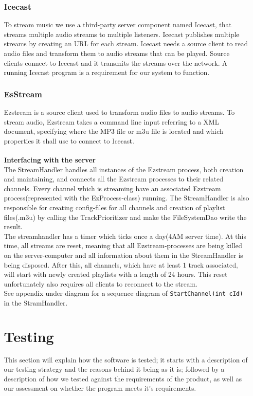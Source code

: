\documentclass[a4paper,11pt,report]{article}
\begin{document}
\subsubsection{Icecast}
To stream music we use a third-party server component named Icecast\cite{IceCast}, that streams multiple audio streams to multiple listeners. Icecast publishes multiple streams by creating an URL for each stream. Icecast needs a source client to read audio files and transform them to audio streams that can be played. Source clients connect to Icecast and it transmits the streams over the network. A running Icecast program is a requirement for our system to function.
\subsubsection{EsStream}
Ezstream\cite{EzStream} is a source client used to transform audio files to audio streams. To stream audio, Ezstream takes a command line input referring to a XML document, specifying where the MP3 file or m3u file is located and which properties it shall use to connect to Icecast. \\ \\
\textbf{Interfacing with the server} \\
The StreamHandler handles all instances of the Ezstream process, both creation and maintaining, and connects all the Ezstream processes to their related channels. Every channel which is streaming have an associated Ezstream process(represented with the EzProcess-class) running. The StreamHandler is also responsible for creating config-files for all channels and creation of playlist files(.m3u) by calling the TrackPrioritizer and make the FileSystemDao write the result. \\

The streamhandler has a timer which ticks once a day(4AM server time). At this time, all streams are reset, meaning that all Ezstream-processes are being killed on the server-computer and all information about them in the StreamHandler is being disposed. After this, all channels, which have at least 1 track associated, will start with newly created playlists with a length of 24 hours. This reset unfortunately also requires all clients to reconnect to the stream. \\

See appendix under diagram for a sequence diagram of \texttt{StartChannel(int cId)} in the StramHandler.


\section{Testing}
This section will explain how the software is tested; it starts with a description of our testing strategy and the reasons behind it being
as it is; followed by a description of how we tested against the requirements of the product, as well as our assessment on whether the program meets it's requirements.
\end{document}
